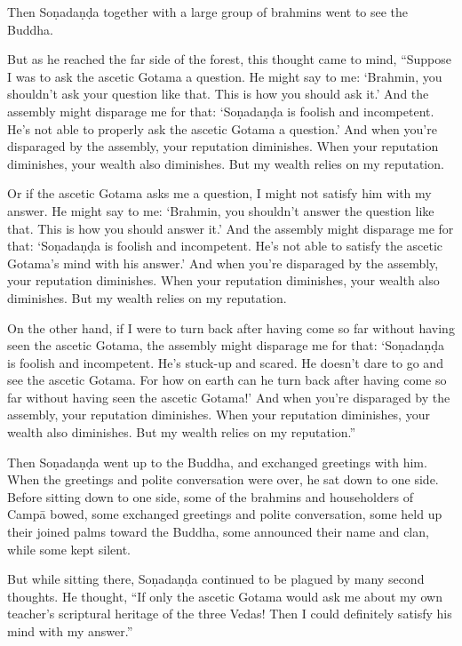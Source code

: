 \documentclass[12pt,openany]{book}%
\begin{document}
Then \textsanskrit{Soṇadaṇḍa} together with a large group of brahmins went to see the Buddha. 

But as he reached the far side of the forest, this thought came to mind, “Suppose I was to ask the ascetic Gotama a question. He might say to me: ‘Brahmin, you shouldn’t ask your question like that. This is how you should ask it.’ And the assembly might disparage me for that: ‘\textsanskrit{Soṇadaṇḍa} is foolish and incompetent. He’s not able to properly ask the ascetic Gotama a question.’ And when you’re disparaged by the assembly, your reputation diminishes. When your reputation diminishes, your wealth also diminishes. But my wealth relies on my reputation. 

Or if the ascetic Gotama asks me a question, I might not satisfy him with my answer. He might say to me: ‘Brahmin, you shouldn’t answer the question like that. This is how you should answer it.’ And the assembly might disparage me for that: ‘\textsanskrit{Soṇadaṇḍa} is foolish and incompetent. He’s not able to satisfy the ascetic Gotama’s mind with his answer.’ And when you’re disparaged by the assembly, your reputation diminishes. When your reputation diminishes, your wealth also diminishes. But my wealth relies on my reputation. 

On the other hand, if I were to turn back after having come so far without having seen the ascetic Gotama, the assembly might disparage me for that: ‘\textsanskrit{Soṇadaṇḍa} is foolish and incompetent. He’s stuck-up and scared. He doesn’t dare to go and see the ascetic Gotama. For how on earth can he turn back after having come so far without having seen the ascetic Gotama!’ And when you’re disparaged by the assembly, your reputation diminishes. When your reputation diminishes, your wealth also diminishes. But my wealth relies on my reputation.” 

Then \textsanskrit{Soṇadaṇḍa} went up to the Buddha, and exchanged greetings with him. When the greetings and polite conversation were over, he sat down to one side. Before sitting down to one side, some of the brahmins and householders of \textsanskrit{Campā} bowed, some exchanged greetings and polite conversation, some held up their joined palms toward the Buddha, some announced their name and clan, while some kept silent. 

But while sitting there, \textsanskrit{Soṇadaṇḍa} continued to be plagued by many second thoughts. He thought, “If only the ascetic Gotama would ask me about my own teacher’s scriptural heritage of the three Vedas! Then I could definitely satisfy his mind with my answer.” 
\end{document}
